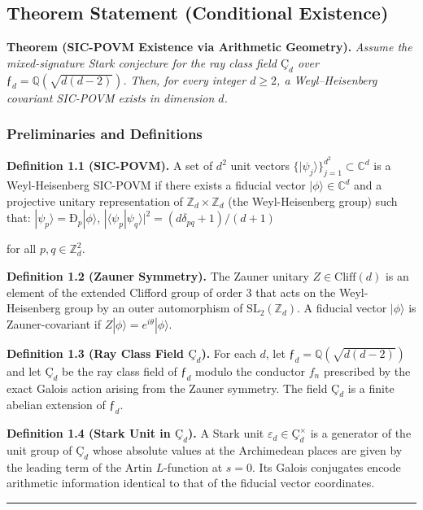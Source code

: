 \documentclass[12pt,a4paper]{article}
\begin{document}
\subsection{Theorem Statement (Conditional Existence)}

\textbf{Theorem (SIC-POVM Existence via Arithmetic Geometry).} \emph{Assume the mixed-signature Stark conjecture for the ray class field $Ç_d$ over $ƒ_d = \mathbb{Q}(\sqrt{d(d-2)})$. Then, for every integer $d \geq 2$, a Weyl--Heisenberg covariant SIC-POVM exists in dimension $d$.}

\subsubsection{Preliminaries and Definitions}

\textbf{Definition 1.1 (SIC-POVM).} A set of $d^2$ unit vectors $\{|\psi_j\rangle\}_{j=1}^{d^2} \subset \mathbb{C}^d$ is a Weyl-Heisenberg SIC-POVM if there exists a fiducial vector $|\phi\rangle \in \mathbb{C}^d$ and a projective unitary representation of $\mathbb{Z}_d \times \mathbb{Z}_d$ (the Weyl-Heisenberg group) such that: $|\psi_p\rangle = Ð_p |\phi\rangle$, $|\langle\psi_p | \psi_q\rangle|^2 = (d \delta_{pq} + 1)/(d+1)$

for all $p, q \in \mathbb{Z}_d^2$.

\textbf{Definition 1.2 (Zauner Symmetry).} The Zauner unitary $Z \in \text{Cliff}(d)$ is an element of the extended Clifford group of order $3$ that acts on the Weyl-Heisenberg group by an outer automorphism of $\text{SL}_2(\mathbb{Z}_d)$. A fiducial vector $|\phi\rangle$ is Zauner-covariant if $Z|\phi\rangle = e^{i\theta}|\phi\rangle$.

\textbf{Definition 1.3 (Ray Class Field $Ç_d$).} For each $d$, let $ƒ_d = \mathbb{Q}(\sqrt{d(d-2)})$ and let $Ç_d$ be the ray class field of $ƒ_d$ modulo the conductor $f_n$ prescribed by the exact Galois action arising from the Zauner symmetry. The field $Ç_d$ is a finite abelian extension of $ƒ_d$.

\textbf{Definition 1.4 (Stark Unit in $Ç_d$).} A Stark unit $\varepsilon_d \in Ç_d^\times$ is a generator of the unit group of $Ç_d$ whose absolute values at the Archimedean places are given by the leading term of the Artin $L$-function at $s=0$. Its Galois conjugates encode arithmetic information identical to that of the fiducial vector coordinates.

\begin{center}
\rule{0.5\textwidth}{0.4pt}
\end{center}
\end{document}
